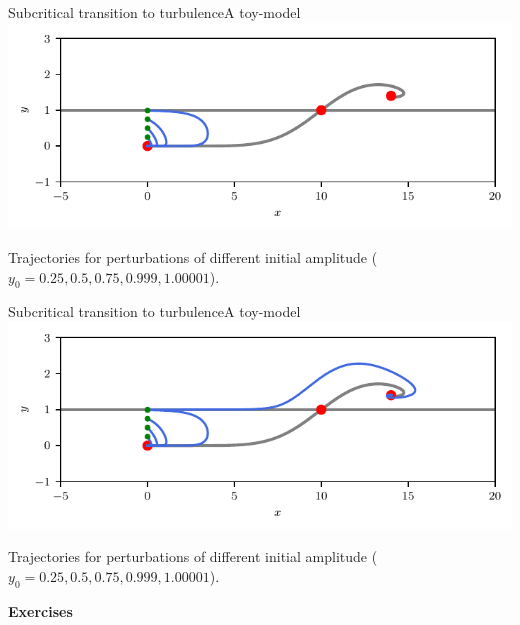 \documentclass[usenames,dvipsnames,svgnames,10pt,aspectratio=169]{beamer}
\begin{document}
\begin{frame}[t, c]{Subcritical transition to turbulence}{A toy-model}
	\centering
	\includegraphics[width=.75\textwidth]{kerswell_phase_plane_ter_3}

	Trajectories for perturbations of different initial amplitude ($y_0 = 0.25, 0.5, 0.75, 0.999, 1.00001$).

	\vspace{1cm}
\end{frame}


\begin{frame}[t, c]{Subcritical transition to turbulence}{A toy-model}
	\centering
	\includegraphics[width=.75\textwidth]{kerswell_phase_plane_ter_4}

	Trajectories for perturbations of different initial amplitude ($y_0 = 0.25, 0.5, 0.75, 0.999, 1.00001$).

	\vspace{1cm}
\end{frame}

\begin{frame}[t, c]{}
	\centering
	\vspace{1cm}

	{\Large \textbf{Exercises}}

	\bigskip

	{}

\end{frame}
\end{document}
